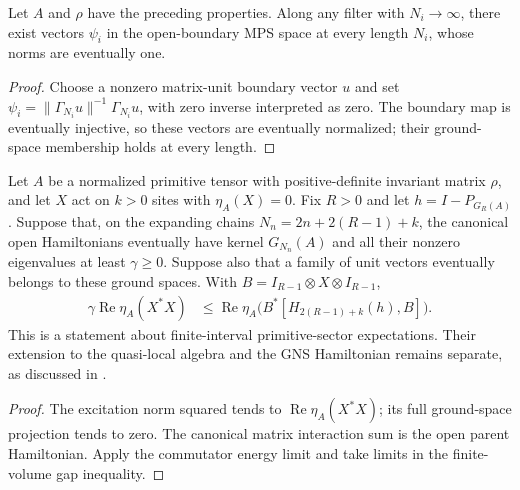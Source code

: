 \begin{lemma}
    \label{thm:primitive_unit_boundary_approximants}
    \leanok
    Let $A$ and $\rho$ have the preceding properties. Along any filter with
    $N_i\to\infty$, there exist vectors $\psi_i$ in the open-boundary MPS
    space at every length $N_i$, whose norms are eventually one.
\end{lemma}
\begin{proof}\leanok
    Choose a nonzero matrix-unit boundary vector $u$ and set
    $\psi_i=\|\Gamma_{N_i}u\|^{-1}\Gamma_{N_i}u$, with zero inverse
    interpreted as zero. The boundary map is eventually injective, so these
    vectors are eventually normalized; their ground-space membership holds
    at every length.
\end{proof}

\begin{lemma}
    \label{thm:primitive_local_commutator_gap}
    \leanok
    Let $A$ be a normalized primitive tensor with positive-definite invariant
    matrix $\rho$, and let $X$ act on $k>0$ sites with $\eta_A(X)=0$.
    Fix $R>0$ and let $h=I-P_{G_R(A)}$. Suppose that, on the expanding
    chains $N_n=2n+2(R-1)+k$, the canonical open Hamiltonians eventually
    have kernel $G_{N_n}(A)$ and all their nonzero eigenvalues at least
    $\gamma\geq0$.
    Suppose also that a family of unit vectors eventually belongs to these
    ground spaces. With $B=I_{R-1}\otimes X\otimes I_{R-1}$,
    \begin{align}
        \gamma\operatorname{Re}\eta_A(X^*X)
         & \leq \operatorname{Re}\eta_A\bigl(B^*[H_{2(R-1)+k}(h),B]\bigr).
    \end{align}
    This is a statement about finite-interval primitive-sector expectations.
    Their extension to the quasi-local algebra and the GNS Hamiltonian remains
    separate, as discussed in
    \cite{gap:nachtergaele96_infinite_volume_ground_projection}.
\end{lemma}
\begin{proof}\leanok
    The excitation norm squared tends to $\operatorname{Re}\eta_A(X^*X)$;
    its full ground-space projection tends to zero. The canonical matrix
    interaction sum is the open parent Hamiltonian. Apply the commutator
    energy limit and take limits in the finite-volume gap inequality.
\end{proof}

